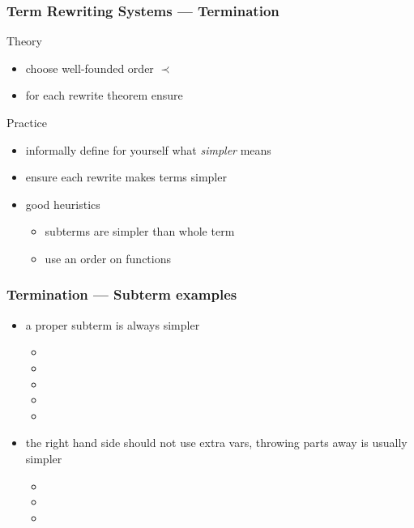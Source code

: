 \begin{frame}
\frametitle{Term Rewriting Systems --- Termination}

\begin{block}{Theory}
\begin{itemize}
\item choose well-founded order $\prec$
\item for each rewrite theorem  ensure 
\end{itemize}
\end{block}

\begin{block}{Practice}
\begin{itemize}
\item informally define for yourself what \emph{simpler} means
\item ensure each rewrite makes terms simpler
\item good heuristics
\begin{itemize}
\item subterms are simpler than whole term
\item use an order on functions
\end{itemize}
\end{itemize}
\end{block}

\end{frame}


\begin{frame}
\frametitle{Termination --- Subterm examples}

\begin{itemize}
\item a proper subterm is always simpler
\begin{itemize}
\item {}
\item {}
\item {}
\item {}
\item {}
\end{itemize}\medskip
\item the right hand side should not use extra vars, throwing parts away is usually simpler
\begin{itemize}
\item {}
\item {}
\item {}
\end{itemize}
\end{itemize}
\end{frame}


